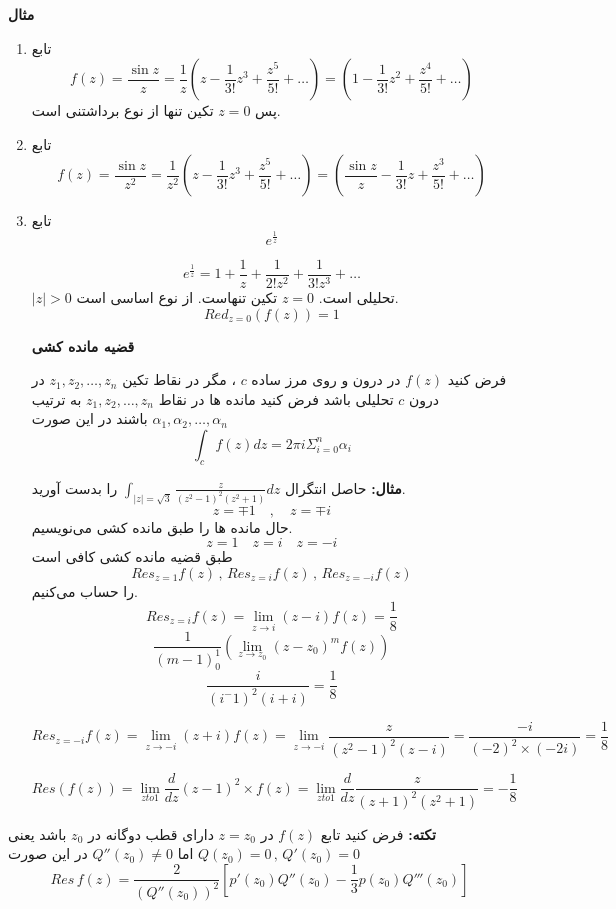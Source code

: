 \documentclass[12pt]{report}
\begin{document}
\textbf{مثال}
\begin{enumerate}
	\item 
	تابع
	$$f(z) = \frac{\sin z}{z} = \frac{1}{z}(z - \frac{1}{3!} z^3 + \frac{z^5}{5!} + \dots) = (1 -\frac{1}{3!} z^2 + \frac{z^4}{5!} + \dots)$$
	پس 
	$z = 0$
	تکین تنها از نوع برداشتنی است.
	\item
	تابع
	$$f(z) = \frac{\sin z}{z^2} = \frac{1}{z^2}(z - \frac{1}{3!} z^3 + \frac{z^5}{5!} + \dots) = (\frac{\sin z}{z} -\frac{1}{3!} z + \frac{z^3}{5!} + \dots)$$
	\item
	تابع
	$$e^{\frac{1}{z}}$$
	
	$$e^{\frac{1}{z}} = 1 + \frac{1}{z} + \frac{1}{2! z^2} + \frac{1}{3! z^3} + \dots$$
	$|z| > 0$
	تحلیلی است.
	$z = 0$
	تکین تنهاست. از نوع اساسی است.
	$$Red_{z = 0}(f(z)) = 1$$
	\newline
	
	\textbf{قضیه مانده کشی}
	
	فرض کنید
	$f(z)$
	در درون و روی مرز ساده
	$c$
	،
	مگر در نقاط تکین 
	$z_1, z_2 , \dots, z_n$
	  در درون 
	  $c$
	  تحلیلی باشد فرض کنید مانده ها در نقاط 
	$z_1, z_2 , \dots, z_n$
	به ترتیب
	$\alpha_1, \alpha_2 , \dots , \alpha_n$
	باشند در این صورت 
	$$\int_{c} f(z) dz = 2\pi i \Sigma_{i = 0}^{n} \alpha_i$$
	\newline
	
	\textbf{مثال:}
	حاصل انتگرال
	$\int_{|z| = \sqrt{3}} \frac{z}{(z^2 - 1)^2(z^2 + 1)} dz$
	را بدست آورید.
	$$z = \mp 1 \quad , \quad z = \mp i$$
	حال مانده ها را طبق مانده کشی می‌نویسیم.
	$$z = 1 \quad z = i \quad z = -i$$
	طبق قضیه مانده کشی کافی است
	$$Res_{z = 1} f(z)\,,\,Res_{z = i} f(z) \,,\, Res_{z=-i} f(z)$$
	را حساب می‌کنیم.
	$$Res_{z = i} f(z) = \lim_{z \to i} (z - i) f(z) = \frac{1}{8} $$
	$$\frac{1}{(m - 1)_{0}^{1}}(\lim_{z \to z_0} (z - z_0)^m f(z))$$
	$$\frac{i}{(i^ - 1)^2( i + i)} = \frac{1}{8}$$
	
	$$Res_{z = -i} f(z) = \lim_{z \to -i} (z +i) f(z) =\lim_{z \to -i}\frac{z}{(z^2 - 1)^2(z - i)} = \frac{-i}{(-2)^2 \times (-2i)} = \frac{1}{8} $$
	
	$$Res(f(z)) = \lim_{z to 1} \frac{d}{dz} (z  - 1)^2 \times f(z) = \lim_{z to 1}\frac{d}{dz} \frac{z}{(z+ 1)^2 (z^2 + 1)} = -\frac{1}{8}$$
\end{enumerate}

\textbf{تکته:}
فرض کنید تابع
$f(z)$
در 
$z = z_0$
دارای قطب دوگانه در 
$z_0$
باشد یعنی 
$Q(z_0) = 0 \,,\, Q'(z_0) = 0$
اما
$Q''(z_0)\neq 0$
در این صورت 
$$Res \, f(z) = \frac{2}{(Q''(z_0))^2}[p'(z_0)Q''(z_0) - \frac{1}{3} p(z_0) Q'''(z_0)]$$
\newline
\end{document}
